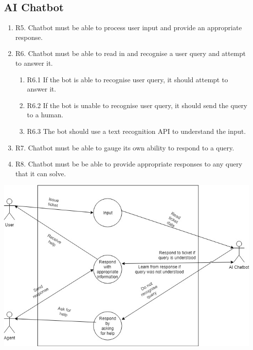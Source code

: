 \documentclass[11pt]{article}
\begin{document}
\subsection{AI Chatbot}
\begin{enumerate}
    \item R5. Chatbot must be able to process user input and provide an appropriate response.
    \item R6. Chatbot must be able to read in and recognise a user query and attempt to answer it.
    \begin{enumerate}
        \item R6.1 If the bot is able to recognise user query, it should attempt to answer it.
        \item R6.2 If the bot is unable to recognise user query, it should send the query to a human.
        \item R6.3 The bot should use a text recognition API to understand the input.
    \end{enumerate}
    \item R7. Chatbot must be able to gauge its own ability to respond to a query.
    \item R8. Chatbot must be be able to provide appropriate responses to any query that it can solve.
\end{enumerate}
\includegraphics[width=1.0\textwidth]{images/AI_Chatbot_UCD.jpg}
\end{document}
